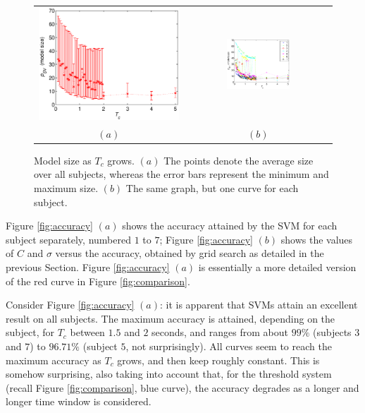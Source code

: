 \documentclass[a4paper,10pt,conference]{ieeeconf}
\begin{document}
\begin{figure}[!t]
  \centering
    \begin{tabular}{cc}
      \includegraphics[width=0.45\linewidth]{SVs.eps} &
      \includegraphics[width=0.45\textwidth]{svs_subj.eps} \\
      $(a)$ & $(b)$
    \end{tabular}
    \caption{Model size as $T_c$ grows. $(a)$ The points denote the
    average size over all subjects, whereas the error bars represent
    the minimum and maximum size. $(b)$ The same graph, but one curve
    for each subject.}
    \label{fig:svs}
\end{figure}

Figure \ref{fig:accuracy} $(a)$ shows the accuracy attained by the SVM
for each subject separately, numbered $1$ to $7$; Figure
\ref{fig:accuracy} $(b)$ shows the values of $C$ and $\sigma$ versus
the accuracy, obtained by grid search as detailed in the previous
Section. Figure \ref{fig:accuracy} $(a)$ is essentially a more
detailed version of the red curve in Figure \ref{fig:comparison}.

Consider Figure \ref{fig:accuracy} $(a)$: it is apparent that SVMs
attain an excellent result on all subjects. The maximum accuracy is
attained, depending on the subject, for $T_c$ between $1.5$ and $2$
seconds, and ranges from about $99\%$ (subjects $3$ and $7$) to
$96.71\%$ (subject $5$, not surprisingly). All curves seem to reach
the maximum accuracy as $T_c$ grows, and then keep roughly
constant. This is somehow surprising, also taking into account that,
for the threshold system (recall Figure \ref{fig:comparison}, blue
curve), the accuracy degrades as a longer and longer time window is
considered.
\end{document}

